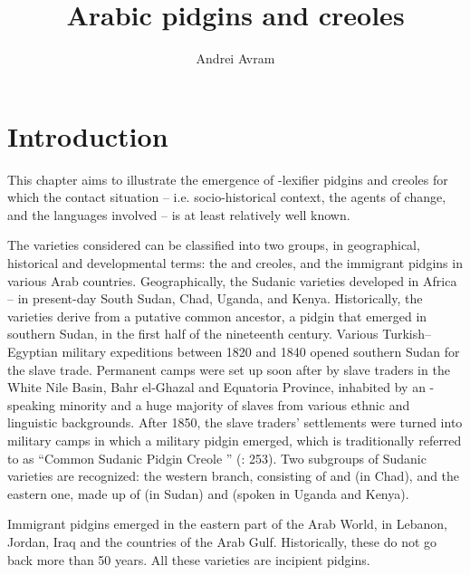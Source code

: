 \documentclass[output=paper]{langsci/langscibook}
\author{Andrei Avram\affiliation{University of Bucharest}}
\title{Arabic pidgins and creoles}
\begin{document}
\maketitle 


\section{Introduction}

This chapter aims to illustrate the emergence of -{lexifier} pidgins and creoles for which the contact situation – i.e. socio-historical context, the agents of change, and the languages involved – is at least relatively well known.

  The varieties considered can be classified into two groups, in geographical, historical and developmental terms: the  and creoles, and the immigrant pidgins in various Arab countries. Geographically, the {Sudanic} varieties developed in Africa – in present-day South Sudan, Chad, Uganda, and Kenya. Historically, the varieties derive from a putative common ancestor, a {pidgin} that emerged in southern Sudan, in the first half of the nineteenth century. Various {Turkish}--Egyptian military expeditions between 1820 and 1840 opened southern Sudan for the slave trade. Permanent camps were set up soon after by slave traders in the White Nile Basin, Bahr el-Ghazal and Equatoria Province, inhabited by an -speaking minority and a huge majority of slaves from various ethnic and linguistic backgrounds. After 1850, the slave traders’ settlements were turned into military camps in which a military {pidgin} emerged, which is traditionally referred to as “Common {Sudanic} Pidgin Creole ” (\citealt{ToscoManfredi2013}: 253). Two subgroups of {Sudanic} varieties are recognized: the western branch, consisting of  and   (in Chad), and the eastern one, made up of   (in Sudan) and  (spoken in Uganda and Kenya). 

  Immigrant pidgins emerged in the eastern part of the Arab World, in Lebanon, Jordan, Iraq and the countries of the Arab Gulf. Historically, these do not go back more than 50 years. All these varieties are incipient pidgins.
\end{document}
